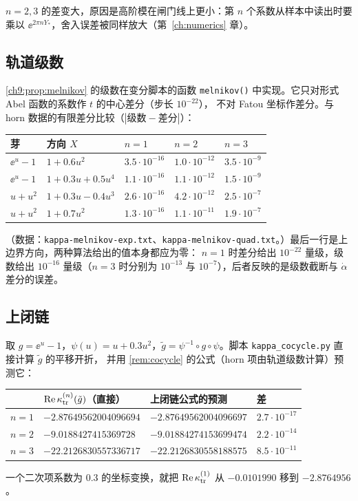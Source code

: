 $n=2,3$ 的差变大，原因是高阶模在闸门线上更小：第 $n$ 个系数从样本中读出时要乘以 $\ee^{2\pi nY_*}$，舍入误差被同样放大（第~\ref{ch:numerics} 章）。

\subsection{轨道级数}
\cref{ch9:prop:melnikov} 的级数在变分脚本的函数 \texttt{melnikov()} 中实现。它只对形式 Abel 函数的系数作 $t$ 的中心差分（步长 $10^{-22}$），
不对 Fatou 坐标作差分。与 horn 数据的有限差分比较（$|\text{级数}-\text{差分}|$）：
\begin{center}\small
\begin{tabular}{lllll}
\toprule
芽 & 方向 $X$ & $n=1$ & $n=2$ & $n=3$\\
\midrule
$\ee^u-1$ & $1+0.6u^2$ & $3.5\cdot10^{-16}$ & $1.0\cdot10^{-12}$ & $3.5\cdot10^{-9}$\\
$\ee^u-1$ & $1+0.3u+0.5u^4$ & $1.1\cdot10^{-16}$ & $1.1\cdot10^{-12}$ & $1.5\cdot10^{-9}$\\
$u+u^2$ & $1+0.3u-0.4u^3$ & $2.6\cdot10^{-16}$ & $4.2\cdot10^{-12}$ & $2.5\cdot10^{-7}$\\
$u+u^2$ & $1+0.7u^2$ & $1.3\cdot10^{-16}$ & $1.1\cdot10^{-11}$ & $1.9\cdot10^{-7}$\\
\bottomrule
\end{tabular}
\end{center}
（数据：\texttt{kappa-melnikov-exp.txt}、\texttt{kappa-melnikov-quad.txt}。）最后一行是上边界方向，两种算法给出的值本身都应为零：
$n=1$ 时差分给出 $10^{-22}$ 量级，级数给出 $10^{-16}$ 量级（$n=3$ 时分别为 $10^{-13}$ 与 $10^{-7}$），后者反映的是级数截断与 $\dot\alpha$ 差分的误差。

\subsection{上闭链}
取 $g=\ee^u-1$，$\psi(u)=u+0.3u^2$，$\tilde g=\psi^{-1}\circ g\circ\psi$。脚本 \texttt{kappa\_cocycle.py} 直接计算 $\tilde g$ 的平移开折，
并用 \cref{rem:cocycle} 的公式（horn 项由轨道级数计算）预测它：
\begin{center}\small
\begin{tabular}{llll}
\toprule
 & $\operatorname{Re}\kappa_{\mathrm{tr}}^{(n)}(\tilde g)$（直接） & 上闭链公式的预测 & 差\\
\midrule
$n=1$ & $-2.87649562004096694$ & $-2.87649562004096697$ & $2.7\cdot10^{-17}$\\
$n=2$ & $-9.0188427415369728$ & $-9.01884274153699474$ & $2.2\cdot10^{-14}$\\
$n=3$ & $-22.2126830557336717$ & $-22.2126830558188575$ & $8.5\cdot10^{-11}$\\
\bottomrule
\end{tabular}
\end{center}
一个二次项系数为 $0.3$ 的坐标变换，就把 $\operatorname{Re}\kappa_{\mathrm{tr}}^{(1)}$ 从 $-0.0101990$ 移到 $-2.8764956$。

